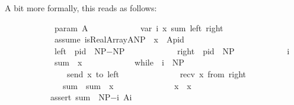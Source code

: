 \begin{isabellebody}
\begin{isamarkuptext}
A bit more formally, this reads as follows:
%
\begin{isabelle}%
\ \ \ \ \ \ \ \ \ \ {}\ \ param\ A{\isacharsemicolon}{\kern0pt}\isanewline
\ \ \ \ \ \ \ \ \ \ {}\ \ var\ i{\isacharcomma}{\kern0pt}\ x{\isacharcomma}{\kern0pt}\ sum{\isacharcomma}{\kern0pt}\ left{\isacharcomma}{\kern0pt}\ right{\isacharsemicolon}{\kern0pt}\isanewline
\ \ \ \ \ \ \ \ \ \ {}\ \ assume\ isRealArray{\isacharparenleft}{\kern0pt}A{\isacharcomma}{\kern0pt}NP{\isacharparenright}{\kern0pt}\ {\isasymand}\ x\ {\isacharequal}{\kern0pt}\ A{\isacharbrackleft}{\kern0pt}pid{\isacharbrackright}{\kern0pt}{\isacharsemicolon}{\kern0pt}\isanewline
\ \ \ \ \ \ \ \ \ \ {}\ \ left\ {\isacharcolon}{\kern0pt}{\isacharequal}{\kern0pt}\ {\isacharparenleft}{\kern0pt}pid\ {\isacharplus}{\kern0pt}\ NP−{}{\isacharparenright}{\kern0pt}{\isacharpercent}{\kern0pt}NP{\isacharsemicolon}{\kern0pt}\isanewline
\ \ \ \ \ \ \ \ \ \ {}\ \ right\ {\isacharcolon}{\kern0pt}{\isacharequal}{\kern0pt}\ {\isacharparenleft}{\kern0pt}pid\ {\isacharplus}{\kern0pt}\ {}{\isacharparenright}{\kern0pt}{\isacharpercent}{\kern0pt}NP{\isacharsemicolon}{\kern0pt}\isanewline
\ \ \ \ \ \ \ \ \ \ {}\ \ i\ {\isacharcolon}{\kern0pt}{\isacharequal}{\kern0pt}\ {}{\isacharsemicolon}{\kern0pt}\isanewline
\ \ \ \ \ \ \ \ \ \ {}\ \ sum\ {\isacharcolon}{\kern0pt}{\isacharequal}{\kern0pt}\ x{\isacharsemicolon}{\kern0pt}\isanewline
\ \ \ \ \ \ \ \ \ \ {}\ \ while\ {\isacharparenleft}{\kern0pt}\ i\ {\isacharless}{\kern0pt}\ NP\ {\isacharparenright}{\kern0pt}\ {\isacharbraceleft}{\kern0pt}\isanewline
\ \ \ \ \ \ \ \ \ \ {}\ \ \ \ \ send\ x\ to\ left{\isacharsemicolon}{\kern0pt}\isanewline
\ \ \ \ \ \ \ \ \ \ {}{}\ \ \ \ recv\ x\ from\ right{\isacharsemicolon}{\kern0pt}\isanewline
\ \ \ \ \ \ \ \ \ \ {}{}\ \ \ \ sum\ {\isacharcolon}{\kern0pt}{\isacharequal}{\kern0pt}\ sum\ {\isacharplus}{\kern0pt}\ x{\isacharsemicolon}{\kern0pt}\isanewline
\ \ \ \ \ \ \ \ \ \ {}{}\ \ \ \ x\ {\isacharcolon}{\kern0pt}{\isacharequal}{\kern0pt}\ x{\isacharplus}{\kern0pt}{}{\isacharsemicolon}{\kern0pt}\isanewline
\ \ \ \ \ \ \ \ \ \ {}{}\ {\isacharbraceright}{\kern0pt}\isanewline
\ \ \ \ \ \ \ \ \ \ {}{}\ assert\ sum\ {\isacharequal}{\kern0pt}\ {\isasymSigma}\isactrlsup N\isactrlsup P\isactrlsup −\isactrlsub i\isactrlsub {\isacharequal}{\kern0pt}\ A{\isacharbrackleft}{\kern0pt}i{\isacharbrackright}{\kern0pt}{\isacharsemicolon}{\kern0pt}%
\end{isabelle}


\end{isamarkuptext}
\end{isabellebody}
